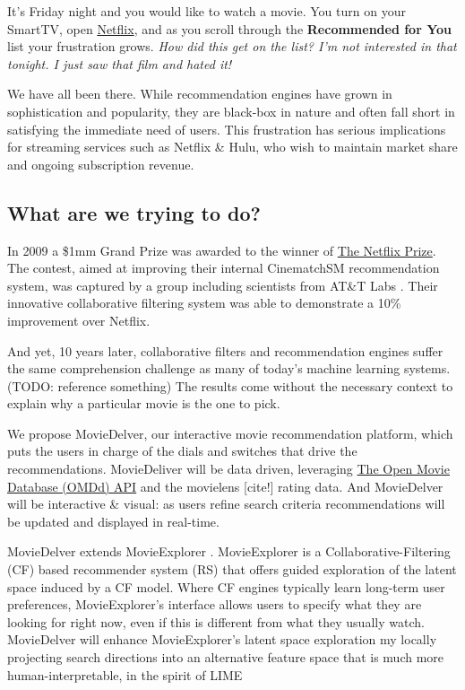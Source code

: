 It's Friday night and you would like to watch a movie.  You turn on your SmartTV, open \href{http://www.netflix.com}{Netflix}, and as you scroll through the \textbf{Recommended for You} list your frustration grows.   \textit{How did this get on the list?  I'm not interested in that tonight.  I just saw that film and hated it!}  

We have all been there.   While recommendation engines have grown in sophistication and popularity, they are black-box in nature and often fall short in satisfying the immediate need of users. This frustration has serious implications for streaming services such as Netflix \& Hulu, who wish to maintain market share and ongoing subscription revenue.  

\subsection{What are we trying to do?}

In 2009 a \$1mm Grand Prize was awarded to the winner of \href{https://www.netflixprize.com/}{The Netflix Prize}. The contest, aimed at improving their internal CinematchSM recommendation system, was captured by a group including scientists from AT\&T Labs \cite{koren2009bellkor}.  Their innovative collaborative filtering system was able to demonstrate a 10\% improvement over Netflix.

And yet, 10 years later, collaborative filters and recommendation engines suffer the same comprehension challenge as many of today's machine learning systems.  (TODO: reference something) The results come without the necessary context to explain why a particular movie is the one to pick.

We propose MovieDelver, our interactive movie recommendation platform, which puts the users in charge of the dials and switches that drive the recommendations.   MovieDeliver will be data driven, leveraging  \href{https://www.omdbapi.com/}{The Open Movie Database (OMDd) API} and the movielens [cite!] rating data.   And MovieDelver will be interactive \& visual: as users refine search criteria recommendations will be updated and displayed in real-time.

MovieDelver extends MovieExplorer \cite{taijala2018movieexplorer}. MovieExplorer is a Collaborative-Filtering (CF) based recommender system (RS) that offers guided exploration of the latent space induced by a CF model. Where CF engines typically learn long-term user preferences, MovieExplorer's interface allows users to specify what they are looking for right now, even if this is different from what they usually watch. MovieDelver will enhance MovieExplorer's latent space exploration my locally projecting search directions into an alternative feature space that is much more human-interpretable, in the spirit of LIME \cite{ribeiro2016should}
